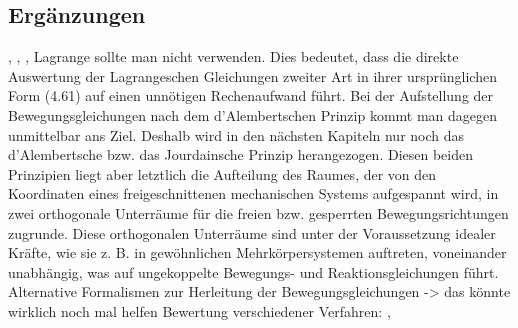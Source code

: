 \subsection{Erg\"anzungen}
\cite[S.38]{Bestle2012}, \cite[S.90]{GeorgRill2014}, \cite[S.87]{Schramm2010}, \hfill \newline
Lagrange sollte man nicht verwenden. Dies bedeutet, dass die direkte Auswertung der Lagrangeschen Gleichungen zweiter Art in ihrer ursprünglichen Form (4.61) auf
einen unnötigen Rechenaufwand führt. Bei der Aufstellung der Bewegungsgleichungen nach
dem d’Alembertschen Prinzip kommt man dagegen unmittelbar ans Ziel. Deshalb wird in den
nächsten Kapiteln nur noch das d’Alembertsche bzw. das Jourdainsche Prinzip herangezogen.
Diesen beiden Prinzipien liegt aber letztlich die Aufteilung des Raumes, der von den Koordinaten eines freigeschnittenen mechanischen Systems aufgespannt wird, in zwei orthogonale
Unterräume für die freien bzw. gesperrten Bewegungsrichtungen zugrunde. Diese orthogonalen
Unterräume sind unter der Voraussetzung idealer Kräfte, wie sie z. B. in gewöhnlichen Mehrkörpersystemen auftreten, voneinander unabhängig, was auf ungekoppelte Bewegungs- und Reaktionsgleichungen führt. \cite[S. 96]{Schiehlen2014}  \hfill \newline
Alternative Formalismen zur Herleitung der Bewegungsgleichungen \cite[S. 131 ff.]{Schiehlen2014}
\cite[S.42]{Pfeiffer2014} -> das k\"onnte wirklich noch mal helfen \hfill \newline
Bewertung verschiedener Verfahren: \cite[S.56]{Pfeiffer2014}, \cite[S.8]{Woernle2011}
